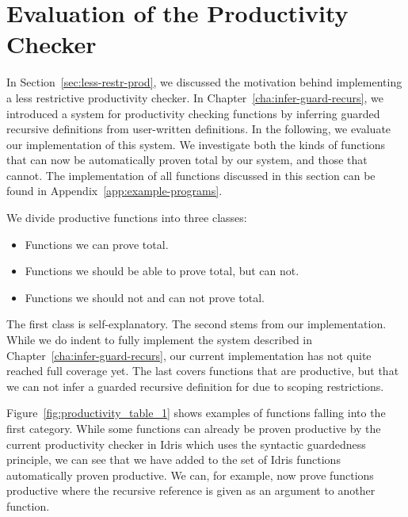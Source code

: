 \chapter{Evaluation of the Productivity Checker}
\label{cha:evaluation}

In Section~\ref{sec:less-restr-prod}, we discussed the motivation behind
implementing a less restrictive productivity checker. In
Chapter~\ref{cha:infer-guard-recurs}, we introduced a system for
productivity checking functions by inferring guarded recursive definitions from
user-written definitions. In the following, we evaluate our implementation of
this system. We investigate both the kinds of functions that can now be automatically proven total by our
system, and those that cannot. The
implementation of all functions discussed in this section can be found in
Appendix~\ref{app:example-programs}. 

We divide productive functions into three classes: 
\begin{itemize}
\item Functions we can prove total.
\item Functions we should be able to prove total, but can not.
\item Functions we should not and can not prove total.
\end{itemize}

The first class is self-explanatory. The second stems from our implementation. While
we do indent to fully implement the system described in
Chapter~\ref{cha:infer-guard-recurs}, our current implementation has not quite
reached full coverage yet. The last covers functions that are productive, but that we
can not infer a guarded recursive definition for due to scoping restrictions.

Figure~\ref{fig:productivity_table_1} shows examples of functions falling into
the first category. While some functions can already be proven productive by the
current productivity checker in Idris which uses the syntactic guardedness
principle, we can see that we have added to the set of Idris functions
automatically proven productive. We can, for example, now prove functions
productive where the recursive reference is given as an argument to another
function.

